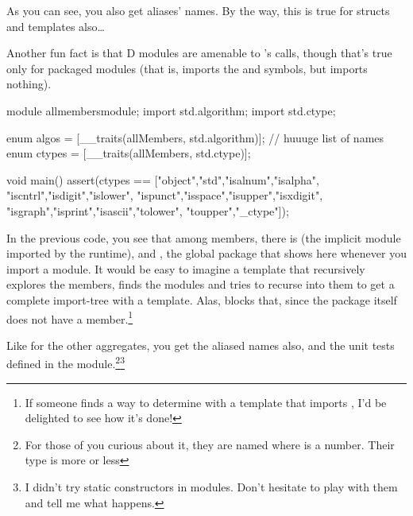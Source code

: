 As you can see, you also get aliases' names. By the way, this is true for structs and templates also\ldots

Another fun fact is that D modules are amenable to 's calls, though that's true only for packaged modules (that is,  imports the  and  symbols, but  imports nothing).

\begin{dcode}
module allmembersmodule;
import std.algorithm;
import std.ctype;

enum algos = [__traits(allMembers, std.algorithm)]; // huuuge list of names
enum ctypes = [__traits(allMembers, std.ctype)];

void main()
{
    assert(ctypes == ["object","std","isalnum","isalpha",
                      "iscntrl","isdigit","islower",
                      "ispunct","isspace","isupper","isxdigit",
                      "isgraph","isprint","isascii","tolower",
                      "toupper","_ctype"]);
}
\end{dcode}

In the previous code, you see that among  members, there is  (the implicit  module imported by the runtime), and , the global package that shows here whenever you import a  module. It would be easy to imagine a template that recursively explores the members, finds the modules and tries to recurse into them to get a complete import-tree with a template. Alas,  blocks that, since the package itself does not have a member.\footnote{ If someone finds a way to determine with a template that  imports , I'd be delighted to see how it's done!}


Like for the other aggregates, you get the aliased names also, and the unit tests defined in the module.\footnote{ For those of you curious about it, they are named  where  is a number. Their type is more or less \DD{()}}\footnote{ I didn't try static constructors in modules. Don't hesitate to play with them and tell me what happens.}

